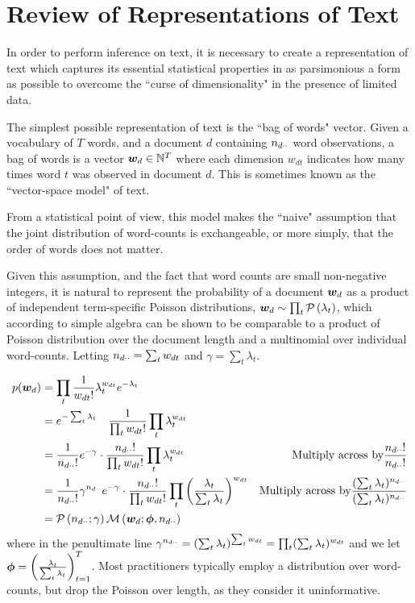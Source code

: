 

\chapter{Review of Representations of Text}

In order to perform inference on text, it is necessary to create a representation of text which captures its essential statistical properties in as parsimonious a form as possible to overcome the ``curse of dimensionality"\cite{Bishop2006} in the presence of limited data.

The simplest possible representation of text is the ``bag of words" vector. Given a vocabulary of $T$ words, and a document $d$ containing ${ n_{d\cdot\cdot} }$ word observations, a bag of words is a vector $\bm w_d \in { \mathbb{N}^{T} }$ where each dimension $w_{dt}$ indicates how many times word $t$ was observed in document $d$. This is sometimes known as the ``vector-space model"\cite{Jst2004} of text. 

From a statistical point of view, this model makes the ``naive" assumption that the joint distribution of word-counts is exchangeable, or more simply, that the order of words does not matter. 

Given this assumption, and the fact that word counts are small non-negative integers, it is natural to represent the probability of a document ${ \bm w_d }$ as a product of independent term-specific Poisson distributions, ${ \bm w_d } \sim \prod_t \mathcal{P} \left( {\lambda_t} \right)$, which according to simple algebra can be shown to be comparable to a product of Poisson distribution over the document length and a multinomial over individual word-counts. Letting ${ n_{d\cdot\cdot} } = \sum_t { w_{dt} }$ and $\gamma = \sum_t \lambda_t$.

\begin{align*}
p({ \bm w_d }) & = \prod_t \frac{1}{ {{ w_{dt} }!} } \lambda_t^{ w_{dt} } e^{-\lambda_t} \\
 &= e^{-\sum_t \lambda_t} \quad \frac{1}{ {\prod_t { w_{dt} }!} } \prod_t \lambda_t^{ w_{dt} } \\
&= \frac{1}{ {{ n_{d\cdot\cdot} } !} } e^{-\gamma} \cdot  \frac{{ n_{d\cdot\cdot} } !}{\prod_t { w_{dt} }!} \prod_t \lambda_t^{ w_{dt} } & \text{Multiply across by}\frac{{ n_{d\cdot\cdot} }!}{{ n_{d\cdot\cdot} }!} \\
&= \frac{1}{ {{ n_{d\cdot\cdot} } !} } \gamma^{ n_{d\cdot\cdot} } e^{-\gamma} \cdot  \frac{{ n_{d\cdot\cdot} } !}{\prod_t { w_{dt} }!} \prod_t \left(\frac{\lambda_t}{\sum_t \lambda_t}\right)^{ w_{dt} } & \text{Multiply across by}\frac{(\sum_t \lambda_t)^{ n_{d\cdot\cdot} }}{(\sum_t \lambda_t)^{ n_{d\cdot\cdot} }} \\
&= \mathcal{P}\left({ n_{d\cdot\cdot} }; \gamma\right) \mathcal{M}\left({ \bm w_d }; \bm \phi, { n_{d\cdot\cdot} }\right)
\end{align*}
where in the penultimate line $\gamma^{ n_{d\cdot\cdot} } = (\sum_t \lambda_t)^{\sum_t { w_{dt} }} = \prod_t (\sum_t \lambda_t)^{ w_{dt} }$ and we let $\bm \phi = \left(\frac{\lambda_t}{\sum_t \lambda_t}\right)_{t=1}^T$. Most practitioners typically employ a distribution over word-counts, but drop the Poisson over length, as they consider it uninformative.

